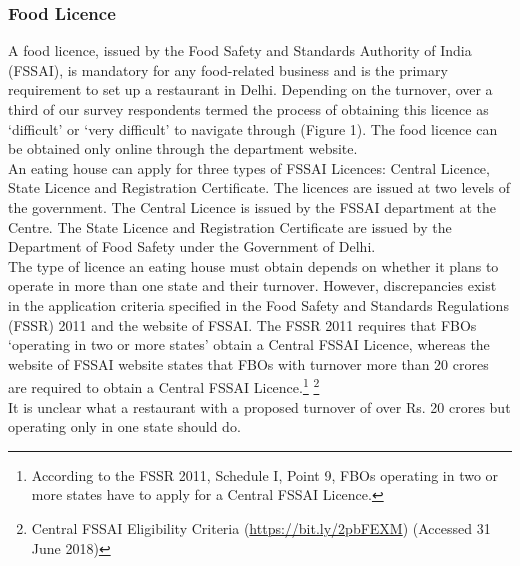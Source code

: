 \documentclass[a4paper, 12pt]{article}
\begin{document}
                                        
                    \subsubsection{Food Licence}
                    A food licence, issued by the Food Safety and Standards Authority of India (FSSAI), is mandatory for any food-related business and is the primary requirement to set up a restaurant in Delhi. Depending on the turnover, over a third of our survey 
respondents termed the process of obtaining this licence as ‘difficult’ or ‘very difficult’ to navigate through (Figure 1). The food licence can be obtained only online through the department website.\\
                    
                    An eating house can apply for three types of FSSAI Licences: Central Licence, State Licence and Registration Certificate. The licences are issued at two levels of the government. The Central Licence is issued by the FSSAI department at the Centre. 
The State Licence and Registration Certificate are issued by the Department of Food Safety under the Government of Delhi.\\
                    
                    The type of licence an eating house must obtain depends on whether it plans to operate in more than one state and their turnover. However, discrepancies exist in the application criteria specified in the Food Safety and Standards Regulations 
(FSSR) 2011 and the website of FSSAI. The FSSR 2011 requires that FBOs ‘operating in two or more states’ obtain a Central FSSAI Licence, whereas the website of FSSAI website states that FBOs with turnover more than 20 crores are required to obtain a 
Central FSSAI Licence.\footnote{According to the FSSR 2011, Schedule I, Point 9, FBOs operating in two or more states have to apply for a Central FSSAI Licence.} \footnote{{Central FSSAI Eligibility Criteria} (\href{https://bit.ly/2pbFEXM}{https://bit.ly/2pbFEXM}) (Accessed 31 June 
2018)} \\
                    
                    It is unclear what a restaurant with a proposed turnover of over Rs. 20 crores but operating only in one state should do. %
                    
\end{document}
